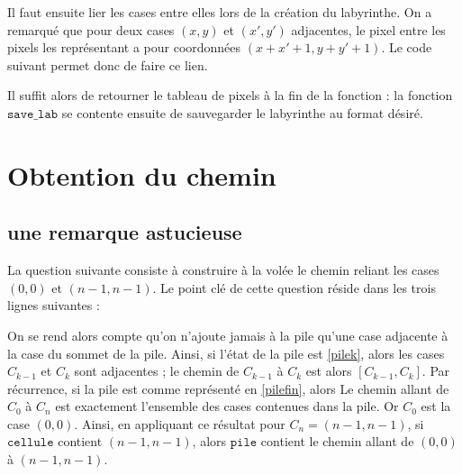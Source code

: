 \documentclass[11pt,a4paper]{article}
\begin{document}


Il faut ensuite lier les cases entre elles lors de la création du labyrinthe. On a remarqué que pour deux cases $(x,y)$ et $(x',y')$ adjacentes, le pixel entre les pixels les représentant a pour coordonnées $(x+x'+1,y+y'+1)$. Le code suivant permet donc de faire ce lien.



Il suffit alors de retourner le tableau de pixels à la fin de la fonction : la fonction $\mathtt{save\_lab}$ se contente ensuite de sauvegarder le labyrinthe au format désiré.




\section{Obtention du chemin}

\subsection{une remarque astucieuse}
La question suivante consiste à construire à la volée le chemin reliant les cases $(0,0)$ et $(n-1,n-1)$.  Le point clé de cette question réside dans les trois lignes suivantes :

On se rend alors compte qu'on n'ajoute jamais à la pile qu'une case adjacente à la case du sommet de la pile. Ainsi, si l'état de la pile est \ref{pilek}, alors les cases $C_{k-1}$ et $C_{k}$ sont adjacentes ; le chemin de $C_{k-1}$ à $C_{k}$ est alors $[C_{k-1},C_{k}]$. Par récurrence, si la pile est comme représenté en \ref{pilefin}, alors Le chemin allant de $C_0$ à $C_n$ est exactement l'ensemble des cases contenues dans la pile. Or $C_0$ est la case $(0,0)$. Ainsi, en appliquant ce résultat pour $C_n = (n-1,n-1)$, si $\mathtt{cellule}$ contient $(n-1,n-1)$, alors $\mathtt{pile}$ contient le chemin allant de $(0,0)$ à $(n-1,n-1)$.
\end{document}
